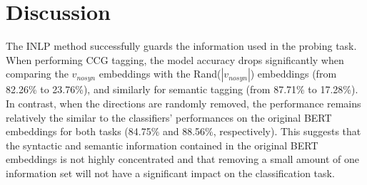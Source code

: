 \documentclass[11pt,a4paper]{article}
\begin{document}



\section{Discussion}
\label{sec:discussion}
The INLP method successfully guards the information used in the probing task. When performing CCG tagging, the model accuracy drops significantly when comparing the $v_{nosyn}$ embeddings with the Rand($|v_{nosyn}|$) embeddings (from 82.26\% to 23.76\%), and similarly for semantic tagging (from 87.71\% to 17.28\%). In contrast, when the directions are randomly removed, the performance remains relatively the similar to the classifiers' performances on the original BERT embeddings for both tasks (84.75\% and 88.56\%, respectively). This suggests that the syntactic and semantic information contained in the original BERT embeddings is not highly concentrated and that removing a small amount of one information set will not have a significant impact on the classification task. 

\end{document}

